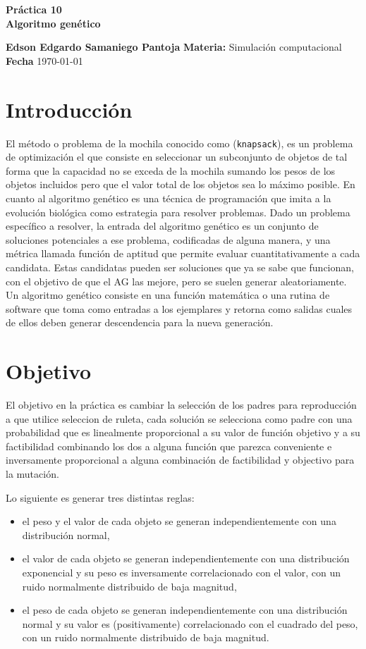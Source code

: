 \documentclass[a4paper, 11pt]{article}
\begin{document}
\begin{center}
\LARGE \bf Pr\'actica 10\\ Algoritmo genético
\end{center}

\vspace{1cm} 
\noindent\textbf {Edson Edgardo Samaniego Pantoja} \hfill \textbf{Materia:} Simulación computacional 
\hfill \\
\textbf{Fecha} \today  
\vspace{1cm} 

\section{Introducción}
El método o problema de la mochila conocido como (\texttt{knapsack}), es un problema de optimización el que consiste en seleccionar un subconjunto de objetos de tal forma que la capacidad no se exceda de la mochila sumando los pesos de los objetos incluidos pero que el valor total de los objetos sea lo máximo posible. 
En cuanto al algoritmo genético es una técnica de programación que imita a la evolución biológica como estrategia para resolver problemas. Dado un problema específico a resolver, la entrada del algoritmo genético es un conjunto de soluciones potenciales a ese problema, codificadas de alguna manera, y una métrica llamada función de aptitud que permite evaluar cuantitativamente a cada candidata. Estas candidatas pueden ser soluciones que ya se sabe que funcionan, con el objetivo de que el AG las mejore, pero se suelen generar aleatoriamente.
Un algoritmo genético consiste en una función matemática o una rutina de software que toma como entradas a los ejemplares y retorna como salidas cuales de ellos deben generar descendencia para la nueva generación.
\section{Objetivo}
El objetivo en la práctica es cambiar la selección de los padres para reproducción a que utilice seleccion de ruleta, cada solución se selecciona como padre con una probabilidad que es linealmente proporcional a su valor de función objetivo y a su factibilidad combinando los dos a alguna función que parezca conveniente e inversamente proporcional a alguna combinación de factibilidad y objectivo para la mutación.

Lo siguiente es generar tres distintas reglas:
\begin{itemize}
    \item el peso y el valor de cada objeto se generan independientemente con una distribución normal,
    \item el valor de cada objeto se generan independientemente con una distribución exponencial y su peso es inversamente correlacionado con el valor, con un ruido normalmente distribuido de baja magnitud,
    \item el peso de cada objeto se generan independientemente con una distribución normal y su valor es (positivamente) correlacionado con el cuadrado del peso, con un ruido normalmente distribuido de baja magnitud.
\end{itemize}
\end{document}
